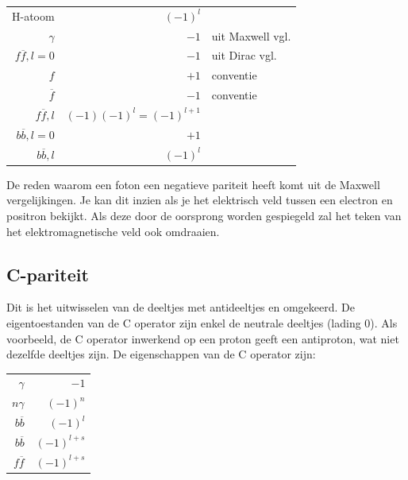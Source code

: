 \documentclass[../main.tex]{subfiles}
\begin{document}
\begin{table}[h]
    \centering
    \label{tab:par_eig}
    \begin{tabular}{r|rl}
        H-atoom             & $(-1)^l$                  &                   \\
        $\gamma$            & $-1$                      & uit Maxwell vgl.  \\
        $f\overline f,l=0$  & $-1$                      & uit Dirac vgl.    \\
        $f$                 & $+1$                      & conventie         \\
        $\overline f$       & $-1$                      & conventie         \\
        $f\overline f,l$    & $(-1)(-1)^l=(-1)^{l+1}$   &                   \\
        $b\overline b,l=0$  & $+1$                      &                   \\
        $b\overline b,l$    & $(-1)^l$                  &                   \\
    \end{tabular}
\end{table}

De reden waarom een foton een negatieve pariteit heeft komt uit de Maxwell vergelijkingen. Je kan dit inzien als je het elektrisch veld tussen een electron en positron bekijkt. Als deze door de oorsprong worden gespiegeld zal het teken van het elektromagnetische veld ook omdraaien.

\subsection{C-pariteit}%
\label{sub:c_pariteit}

Dit is het uitwisselen van de deeltjes met antideeltjes en omgekeerd. De eigentoestanden van de C operator zijn enkel de neutrale deeltjes (lading 0). Als voorbeeld, de C operator inwerkend op een proton geeft een antiproton, wat niet dezelfde deeltjes zijn. De eigenschappen van de C operator zijn:

\begin{table}[h]
    \centering
    \label{tab:c_eig}
    \begin{tabular}{r|r}
        $\gamma$        & $-1$          \\
        $n\gamma$       & $(-1)^n$      \\
        $b \overline b$ & $(-1)^{l}$  \\
        $b \overline b$ & $(-1)^{l+s}$  \\
        $f \overline f$ & $(-1)^{l+s}$  \\
    \end{tabular}
\end{table}
\end{document}

